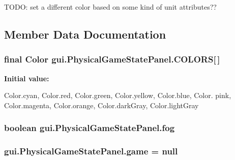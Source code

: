 TODO: set a different color based on some kind of unit attributes?? 



\subsection{Member Data Documentation}
\hypertarget{classgui_1_1_physical_game_state_panel_a7d68857c003b8564dc76a758ae7ba553}{
\subsubsection[{COLORS}]{\setlength{\rightskip}{0pt plus 5cm}final Color {\bf gui.PhysicalGameStatePanel.COLORS}\mbox{[}$\,$\mbox{]}}}
\label{classgui_1_1_physical_game_state_panel_a7d68857c003b8564dc76a758ae7ba553}
{\bfseries Initial value:}
\begin{DoxyCode}
 {Color.cyan, Color.red, Color.green, Color.yellow, Color.blue,
                                                                           Color.
      pink, Color.magenta, Color.orange, Color.darkGray, Color.lightGray
                                                                          }
\end{DoxyCode}
\hypertarget{classgui_1_1_physical_game_state_panel_af859a1252f3fe668b30566bb26fff610}{
\subsubsection[{fog}]{\setlength{\rightskip}{0pt plus 5cm}boolean {\bf gui.PhysicalGameStatePanel.fog}}}
\label{classgui_1_1_physical_game_state_panel_af859a1252f3fe668b30566bb26fff610}
\hypertarget{classgui_1_1_physical_game_state_panel_af4eaee7c6480b100814b944ee2d8c6bd}{
\subsubsection[{game}]{ {\bf gui.PhysicalGameStatePanel.game} = null}}
